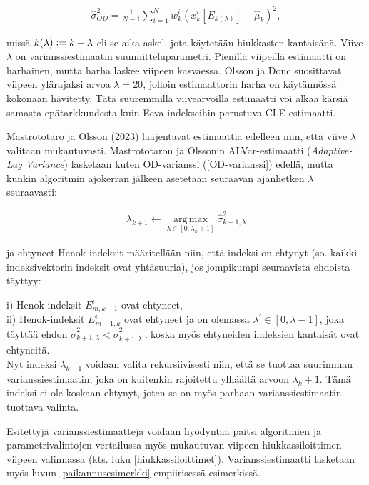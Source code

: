\documentclass[
  12pt,
  a4paper, twoside]{book}
\begin{document}
\begin{align}\label{OD-varianssi}
\hat{\sigma}^2_{OD} = \frac{1}{N-1} \sum_{i=1}^N w_k^i (x_k^i[E_{k(\lambda)}]-\hat{\mu}_k)^2
,\end{align}

\noindent missä \(k(\lambda) \vcentcolon= k-\lambda\) eli se aika-askel, jota käytetään hiukkasten kantaisänä. Viive \(\lambda\) on varianssiestimaatin suunnitteluparametri. Pienillä viipeillä estimaatti on harhainen, mutta harha laskee viipeen kasvaessa. Olsson ja Douc suosittavat viipeen ylärajaksi arvoa \(\lambda=20\), jolloin estimaattorin harha on käytännössä kokonaan hävitetty. Tätä suuremmilla viivearvoilla estimaatti voi alkaa kärsiä samasta epätarkkuudesta kuin Eeva-indekseihin perustuva CLE-estimaatti.

Mastrototaro ja Olsson (2023) \citep{Mastrototaro-2023} laajentavat estimaattia edelleen niin, että viive \(\lambda\) valitaan mukautuvasti. Mastrototaron ja Olssonin ALVar-estimaatti (\emph{Adaptive-Lag Variance}) lasketaan kuten OD-varianssi (\ref{OD-varianssi}) edellä, mutta kunkin algoritmin ajokerran jälkeen asetetaan seuraavan ajanhetken \(\lambda\) seuraavasti:

\begin{align}\label{ALVar-lambda}
\lambda_{k+1} \leftarrow \operatorname*{arg\,max}_{\lambda \in [0, \lambda_k + 1]} \hat{\sigma}^2_{k+1,\lambda}
\end{align}

\noindent ja ehtyneet Henok-indeksit määritellään niin, että indeksi on ehtynyt (so. kaikki indeksivektorin indeksit ovat yhtäsuuria), jos jompikumpi seuraavista ehdoista täyttyy:

\hfill\break
i) Henok-indeksit \(E^i_{m,k-1}\) ovat ehtyneet,\\
ii) Henok-indeksit \(E^i_{m-1,k}\) ovat ehtyneet ja on olemassa \(\lambda^\prime \in [0, \lambda-1]\), joka täyttää ehdon \(\hat{\sigma}^2_{k+1,\lambda} < \hat{\sigma}^2_{k+1,\lambda^\prime}\), koska myös ehtyneiden indeksien kantaisät ovat ehtyneitä.\\

Nyt indeksi \(\lambda_{k+1}\) voidaan valita rekursiivisesti niin, että se tuottaa suurimman varianssiestimaatin, joka on kuitenkin rajoitettu ylhäältä arvoon \(\lambda_k+1\). Tämä indeksi ei ole koskaan ehtynyt, joten se on myös parhaan varianssiestimaatin tuottava valinta.

Esitettyjä varianssiestimaatteja voidaan hyödyntää paitsi algoritmien ja parametrivalintojen vertailussa myös mukautuvan viipeen hiukkassiloittimen viipeen valinnassa (kts. luku \ref{hiukkassiloittimet}). Varianssiestimaatti lasketaan myös luvun \ref{paikannusesimerkki} empiirisessä esimerkissä.
\end{document}

